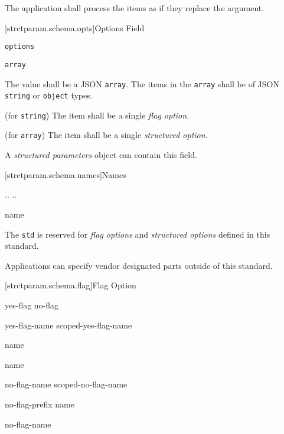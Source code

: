 The application shall process the items as if they replace the
 argument.

[strctparam.schema.opts]{Options Field}

\begin{itemdescr}

	\pnum \fldname \verb|options|

	\pnum \fldtype \verb|array|

	\pnum \fldval
	The value shall be a JSON \verb|array|. The items in the \verb|array| shall
	be of JSON \verb|string| or \verb|object| types.

	\pnum \flditems
	(for \verb|string|) The item shall be a single \emph{flag option}.

	\pnum \flditems
	(for \verb|array|) The item shall be a single \emph{structured option}.

	\pnum \flddesc
	A \emph{structured parameters} object can contain this field.

\end{itemdescr}

[strctparam.schema.names]{Names}

\pnum
\begin{ncbnf}

\br
	\br
	 ..  \br
	 ..  \br
	   

\br
	name 

\br
	 

\end{ncbnf}

\pnum
The  \verb|std| is reserved for \emph{flag options} and
\emph{structured options} defined in this standard.

\pnum
Applications can specify vendor designated  parts outside of
this standard.

[strctparam.schema.flag]{Flag Option}

\pnum
\begin{ncbnf}

\br
	 yes-flag no-flag

\br
	 yes-flag-name scoped-yes-flag-name

\br
	name

\br
	 name

\br
	 no-flag-name scoped-no-flag-name

\br
	no-flag-prefix name

\br
	 no-flag-name

\br
	 
	 
	 

\end{ncbnf}

